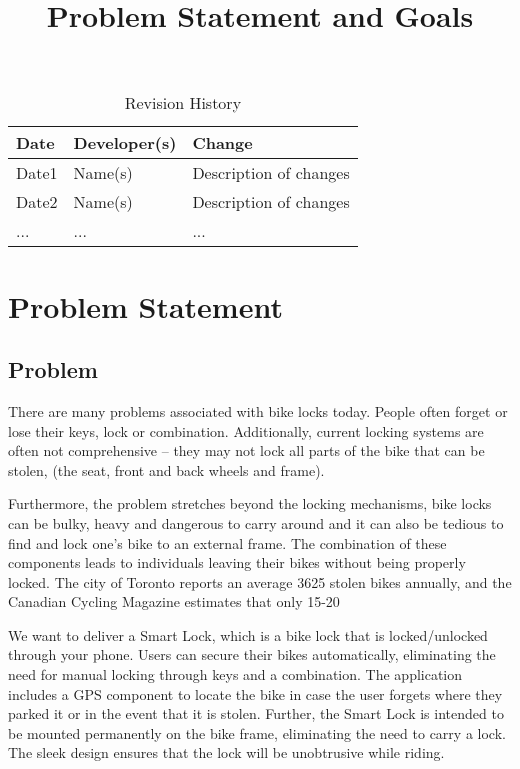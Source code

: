 \documentclass{article}
\title{Problem Statement and Goals\\\progname}
\author{\authname}
\date{}
\begin{document}
\maketitle

\begin{table}[hp]
\caption{Revision History} \label{TblRevisionHistory}
\begin{tabularx}{\textwidth}{llX}
\toprule
\textbf{Date} & \textbf{Developer(s)} & \textbf{Change}\\
\midrule
Date1 & Name(s) & Description of changes\\
Date2 & Name(s) & Description of changes\\
... & ... & ...\\
\bottomrule
\end{tabularx}
\end{table}

\section{Problem Statement}


\subsection{Problem}

There are many problems associated with bike locks today.  People often forget or lose their keys, lock or combination.  Additionally, current locking systems are often not comprehensive – they may not lock all parts of the bike that can be stolen, (the seat, front and back wheels and frame). 

Furthermore, the problem stretches beyond the locking mechanisms, bike locks can be bulky, heavy and dangerous to carry around and it can also be tedious to find and lock one’s bike to an external frame.  The combination of these components leads to individuals leaving their bikes without being properly locked.  The city of Toronto reports an average 3625 stolen bikes annually, and the Canadian Cycling Magazine estimates that only 15-20%

We want to deliver a Smart Lock, which is a bike lock that is locked/unlocked through your phone.  Users can secure their bikes automatically, eliminating the need for manual locking through keys and a combination.  The application includes a GPS component to locate the bike in case the user forgets where they parked it or in the event that it is stolen.  Further, the Smart Lock is intended to be mounted permanently on the bike frame, eliminating the need to carry a lock.  The sleek design ensures that the lock will be unobtrusive while riding. 
\end{document}
